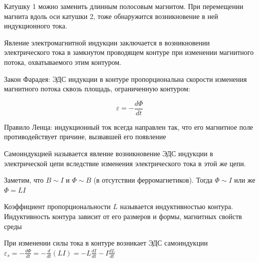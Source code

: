\documentclass[12pt]{article}
\begin{document}
Катушку 1 можно заменить длинным полосовым магнитом. При перемещении магнита вдоль оси катушки 2, тоже обнаружится возникновение в ней 
индукционного тока.

Явление электромагнитной индукции заключается в возникновении электрического тока в замкнутом проводящем
контуре при изменении магнитного потока, охватываемого этим контуром. 

\begin{MyTheorem}
    Закон Фарадея: ЭДС индукции в контуре пропорциональна скорости изменения магнитного потока сквозь площадь, 
    ограниченную контуром:

    \[\varepsilon = - \frac{d\Phi}{dt}\]
\end{MyTheorem}

\begin{MyTheorem}
    Правило Ленца: индукционный ток всегда направлен так, что его магнитное поле противодействует причине, вызвавшей его появление
\end{MyTheorem}

Самоиндукцией называется явление возникновение ЭДС индукции в электрической цепи вследствие
изменения электрического тока в этой же цепи.

Заметим, что $B \sim I$ и $\Phi \sim B$ (в отсутствии ферромагнетиков). Тогда $\Phi \sim I$ или же $\Phi = LI$

Коэффициент пропорциональности $L$ называется индуктивностью контура. Индуктивность контура зависит от его размеров
и формы, магнитных свойств среды

При изменении силы тока в контуре возникает ЭДС самоиндукции $\varepsilon_s = -\frac{d\Phi}{dt} = -\frac{d}{dt}(LI) = -L\frac{dI}{dt} - I\frac{dL}{dt}$

\clearpage

\end{document}
